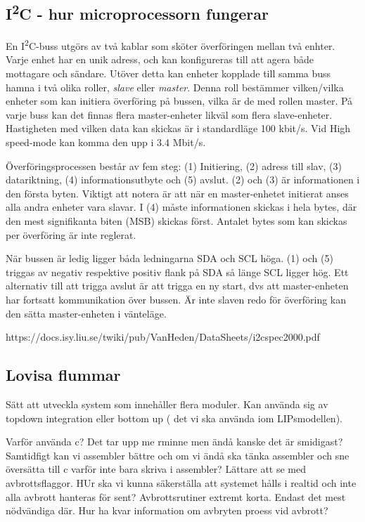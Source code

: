 \documentclass[11pt]{article}
\begin{document}
\begin{flushleft}
\subsection{I\textsuperscript{2}C - hur microprocessorn fungerar}
En I\textsuperscript{2}C-buss utgörs av två kablar som sköter överföringen mellan två enhter. Varje enhet har en unik adress, och kan konfigureras till att agera både mottagare och sändare. Utöver detta kan enheter kopplade till samma buss hamna i två olika roller, \textit{slave} eller \textit{master}. Denna roll bestämmer vilken/vilka enheter som kan initiera överföring på bussen, vilka är de med rollen master. På varje buss kan det finnas flera master-enheter likväl som flera slave-enheter. Hastigheten med vilken data kan skickas är i standardläge 100 kbit/s. Vid High speed-mode kan komma den upp i 3.4 Mbit/s.

Överföringsprocessen består av fem steg: (1) Initiering, (2) adress till slav, (3) datariktning, (4) informationsutbyte och (5) avslut. (2) och (3) är informationen i den första byten. Viktigt att notera är att när en master-enhetet initierat anses alla andra enheter vara slavar. I (4) måste informationen skickas i hela bytes, där den mest signifikanta biten (MSB) skickas först. Antalet bytes som kan skickas per överföring är inte reglerat.

När bussen är ledig ligger båda ledningarna SDA och SCL höga. (1) och (5) triggas av negativ respektive positiv flank på SDA så länge SCL ligger hög. Ett alternativ till att trigga avslut är att trigga en ny start, dvs att master-enheten har fortsatt kommunikation över bussen. Är inte slaven redo för överföring kan den sätta master-enheten i vänteläge.

https://docs.isy.liu.se/twiki/pub/VanHeden/DataSheets/i2cspec2000.pdf


\subsection{Lovisa flummar}
Sätt att utveckla system som innehåller flera moduler.
Kan använda sig av topdown integration eller bottom up ( det vi ska använda iom LIPsmodellen).

Varför använda c? Det tar upp me rminne men ändå kanske det är smidigast? Samtidfigt kan vi assembler bättre och om vi ändå ska tänka assembler och sne översätta till c varför inte bara skriva i assembler? Lättare att se med avbrottsflaggor.
HUr ska vi kunna säkerställa att systemet hålls i realtid och inte alla avbrott hanteras för sent? Avbrottsrutiner extremt korta. Endast det mest nödvändiga där. Hur ha kvar information om avbryten proess vid avbrott?


\end{flushleft}
\end{document}
